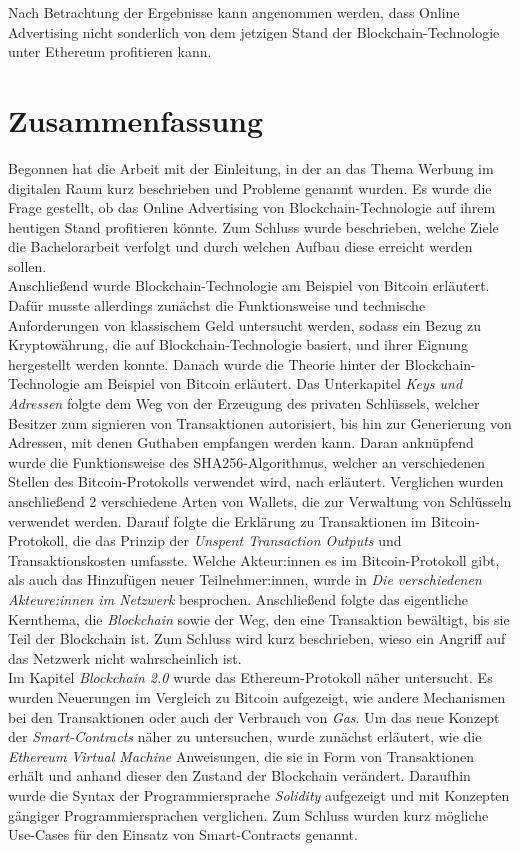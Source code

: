 Nach Betrachtung der Ergebnisse kann angenommen werden, dass Online Advertising nicht sonderlich von dem jetzigen Stand der Blockchain-Technologie unter Ethereum profitieren kann.
\section{Zusammenfassung}
Begonnen hat die Arbeit mit der Einleitung, in der an das Thema Werbung im digitalen Raum kurz beschrieben und Probleme genannt wurden. Es wurde die Frage gestellt, ob das Online Advertising von Blockchain-Technologie auf ihrem heutigen Stand profitieren könnte. Zum Schluss wurde beschrieben, welche Ziele die Bachelorarbeit verfolgt und durch welchen Aufbau diese erreicht werden sollen.\\
 
Anschließend wurde Blockchain-Technologie am Beispiel von Bitcoin erläutert. Dafür musste allerdings zunächst die Funktionsweise und technische Anforderungen von klassischem Geld untersucht werden, sodass ein Bezug zu Kryptowährung, die auf Blockchain-Technologie basiert, und ihrer Eignung hergestellt werden konnte. 
Danach wurde die Theorie hinter der Blockchain-Technologie am Beispiel von Bitcoin erläutert. 
Das Unterkapitel \emph{Keys und Adressen} folgte dem Weg von der Erzeugung des privaten Schlüssels, welcher Besitzer zum signieren von Transaktionen autorisiert, bis hin zur Generierung von Adressen, mit denen Guthaben empfangen werden kann. 
Daran anknüpfend wurde die Funktionsweise des SHA256-Algorithmus, welcher an verschiedenen Stellen des Bitcoin-Protokolls verwendet wird, nach \cite{dang_2015} erläutert. 
Verglichen wurden anschließend 2 verschiedene Arten von Wallets, die zur Verwaltung von Schlüsseln verwendet werden.
Darauf folgte die Erklärung zu Transaktionen im Bitcoin-Protokoll, die das Prinzip der \emph{Unspent Transaction Outputs} und Transaktionskosten umfasste.
Welche Akteur:innen es im Bitcoin-Protokoll gibt, als auch das Hinzufügen neuer Teilnehmer:innen, wurde in \emph{Die verschiedenen Akteure:innen im Netzwerk} besprochen.
Anschließend folgte das eigentliche Kernthema, die \emph{Blockchain} sowie der Weg, den eine Transaktion bewältigt, bis sie Teil der Blockchain ist. Zum Schluss wird kurz beschrieben, wieso ein Angriff auf das Netzwerk nicht wahrscheinlich ist.\\

Im Kapitel \emph{Blockchain 2.0} wurde das Ethereum-Protokoll näher untersucht. Es wurden Neuerungen im Vergleich zu Bitcoin aufgezeigt, wie andere Mechanismen bei den Transaktionen oder auch der Verbrauch von \emph{Gas}.
Um das neue Konzept der \emph{Smart-Contracts} näher zu untersuchen, wurde zunächst erläutert, wie die \emph{Ethereum Virtual Machine} Anweisungen, die sie in Form von Transaktionen erhält und anhand dieser den Zustand der Blockchain verändert. Daraufhin wurde die Syntax der Programmiersprache \emph{Solidity} aufgezeigt und mit Konzepten gängiger Programmiersprachen verglichen.
Zum Schluss wurden kurz mögliche Use-Cases für den Einsatz von Smart-Contracts genannt.\\

